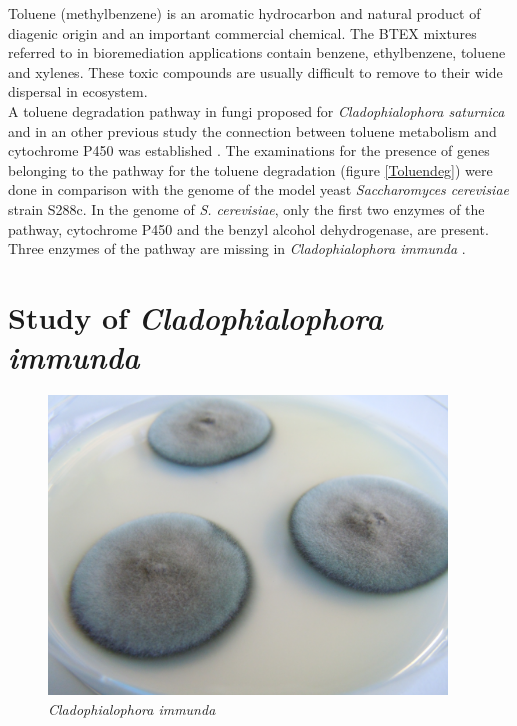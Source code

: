 \documentclass[12pt, a4paper]{report}
\begin{document}
Toluene (methylbenzene) is an aromatic hydrocarbon and natural product of diagenic origin and an important commercial chemical. The BTEX mixtures referred to in bioremediation applications contain benzene, ethylbenzene, toluene and xylenes. These toxic compounds are usually difficult to remove to their wide dispersal in ecosystem. 
\\
A toluene degradation pathway in fungi proposed for \textit{Cladophialophora saturnica} \cite{Badali2008} and in an other previous study the connection between toluene metabolism and cytochrome P450 was established \cite{Luykx2003}. The examinations for the presence of genes belonging to the pathway for the toluene degradation (figure \ref{Toluendeg}) were done in comparison with the genome of the model yeast \textit{Saccharomyces cerevisiae} strain S288c. In the genome of \textit{S. cerevisiae}, only the first two enzymes of the pathway, cytochrome P450 and the benzyl alcohol dehydrogenase, are present. Three enzymes of the pathway are missing in  \textit{Cladophialophora immunda} \cite{Blasi2016, Parales2008}. \\


\section{Study of \textit{Cladophialophora immunda}}\label{study}
 \begin{figure}[H]
 	\centering	
 	\includegraphics[width=300pt]{pics/cimmunda1.JPG}
 	\caption[\textit{Cladophialophora immunda}]
 	{\textit{Cladophialophora immunda}}
 \end{figure}
 
\end{document}
